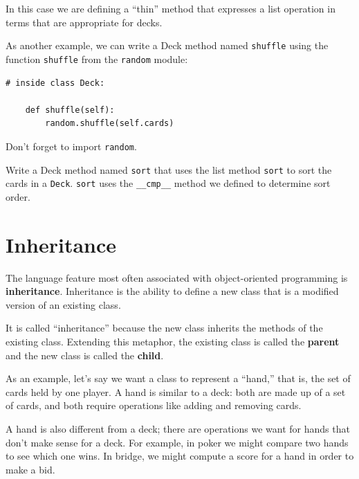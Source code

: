 \documentclass[10pt]{book}
\begin{document}
\begin{CJK}{UTF8}{gbsn}
In this case we are defining a ``thin'' method that expresses
a list operation in terms that are appropriate for decks.

As another example, we can write a Deck method named {\tt shuffle}
using the function {\tt shuffle} from the {\tt random} module:

\begin{verbatim}
# inside class Deck:
            
    def shuffle(self):
        random.shuffle(self.cards)
\end{verbatim}
%
Don't forget to import {\tt random}.

\begin{exercise}

Write a Deck method named {\tt sort} that uses the list method
{\tt sort} to sort the cards in a {\tt Deck}.  {\tt sort} uses
the \verb"__cmp__" method we defined to determine sort order.
\end{exercise}



\section{Inheritance}

The language feature most often associated with object-oriented
programming is {\bf inheritance}.  Inheritance is the ability to
define a new class that is a modified version of an existing
class.

It is called ``inheritance'' because the new class inherits the
methods of the existing class.  Extending this metaphor, the existing
class is called the {\bf parent} and the new class is
called the {\bf child}.

As an example, let's say we want a class to represent a ``hand,''
that is, the set of cards held by one player.  A hand is similar to a
deck: both are made up of a set of cards, and both require operations
like adding and removing cards.

A hand is also different from a deck; there are operations we want for
hands that don't make sense for a deck.  For example, in poker we
might compare two hands to see which one wins.  In bridge, we might
compute a score for a hand in order to make a bid.


\end{CJK}
\end{document}
